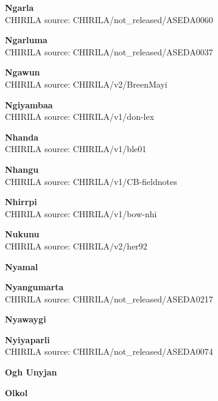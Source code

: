 \textbf{Ngarla}\\
CHIRILA source: CHIRILA/not\_released/ASEDA0060


\textbf{Ngarluma}\\
CHIRILA source: CHIRILA/not\_released/ASEDA0037


\textbf{Ngawun}\\
CHIRILA source: CHIRILA/v2/BreenMayi


\textbf{Ngiyambaa}\\
CHIRILA source: CHIRILA/v1/don-lex


\textbf{Nhanda}\\
CHIRILA source: CHIRILA/v1/ble01


\textbf{Nhangu}\\
CHIRILA source: CHIRILA/v1/CB-fieldnotes


\textbf{Nhirrpi}\\
CHIRILA source: CHIRILA/v1/bow-nhi


\textbf{Nukunu}\\
CHIRILA source: CHIRILA/v2/her92


\textbf{Nyamal}\\

\textbf{Nyangumarta}\\
CHIRILA source: CHIRILA/not\_released/ASEDA0217


\textbf{Nyawaygi}\\

\textbf{Nyiyaparli}\\
CHIRILA source: CHIRILA/not\_released/ASEDA0074


\textbf{Ogh Unyjan}\\

\textbf{Olkol}\\

